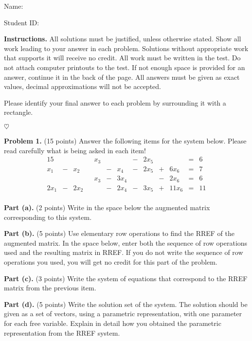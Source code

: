 \documentclass[12pt]{article}
\begin{document}
Name: \hrulefill

\bigskip
Student ID: \hrulefill

\bigskip
\textbf{Instructions.} All solutions must be justified, unless otherwise stated. Show all work leading to your answer in each problem. Solutions without appropriate work that supports it will receive no credit. All work must be written in the test. Do not attach computer printouts to the test. If not enough space is provided for an answer, continue it in the back of the page. All answers must be given as exact values, decimal approximations will not be accepted.

Please identify your final answer to each problem by surrounding it with a rectangle.

\vfill
\hfill$\heartsuit$

\clearpage

\textbf{Problem 1.} (15 points)
Answer the following items for the system below. Please read carefully what is being asked in each item!
\begin{alignat*}{15}
&{}{}&&{}{}&x_{3}&{}{}& &{}-{}& 2 x_{5}&{}{}& &{}={}&6\\ 
x_{1} &{}-{}& x_{2}&{}{}& &{}-{}& x_{4} &{}-{}& 2 x_{5} &{}+{}& 6 x_{6} &{}={}&7\\ 
&{}{}&&{}{}&x_{3} &{}-{}& 3 x_{4}&{}{}& &{}-{}& 2 x_{6} &{}={}&6\\ 
2 x_{1} &{}-{}& 2 x_{2}&{}{}& &{}-{}& 2 x_{4} &{}-{}& 3 x_{5} &{}+{}& 11 x_{6} &{}={}&11\\ 
\end{alignat*}

\textbf{Part (a).} (2 points) Write in the space below the augmented matrix corresponding to this system.

\vskip1.5in

\textbf{Part (b).} (5 points) Use elementary row operations to find the RREF of the augmented matrix. In the space below, enter both the sequence of row operations used and the resulting matrix in RREF. If you do not write the sequence of row operations you used, you will get no credit for this part of the problem.

\clearpage

\textbf{Part (c).} (3 points) Write the system of equations that correspond to the RREF matrix from the previous item.

\vskip2in

\textbf{Part (d).} (5 points) Write the solution set of the system. The solution should be given as a set of vectors, using a parametric representation, with one parameter for each free variable. Explain in detail how you obtained the parametric representation from the RREF system.
\end{document}
